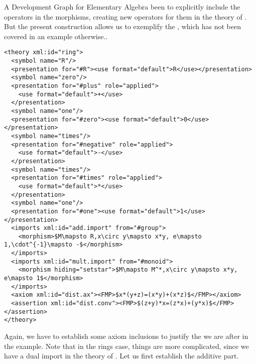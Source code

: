 \begin{omgroup}[id=dg-elal]{A Development Graph for Elementary Algebra}
{  been to explicitly include the operators in the morphisms, creating new operators for
  them in the theory of {}.  But the present construction allows us to
  exemplify the {}, which has not been covered in an example
  otherwise.}.
\begin{lstlisting}[mathescape,index={theory,imports}]
<theory xml:id="ring"> 
  <symbol name="R"/>
  <presentation for="#R"><use format="default">R</use></presentation>
  <symbol name="zero"/>
  <presentation for="#plus" role="applied">
    <use format="default">+</use>
  </presentation>
  <symbol name="one"/> 
  <presentation for="#zero"><use format="default">0</use></presentation>
  <symbol name="times"/>
  <presentation for="#negative" role="applied">
    <use format="default">-</use>
  </presentation>
  <symbol name="times"/>
  <presentation for="#times" role="applied">
    <use format="default">*</use>
  </presentation>
  <symbol name="one"/> 
  <presentation for="#one"><use format="default">1</use></presentation>
  <imports xml:id="add.import" from="#group"> 
    <morphism>$M\mapsto R,x\circ y\mapsto x*y, e\mapsto 1,\cdot^{-1}\mapsto -$</morphism> 
  </imports> 
  <imports xml:id="mult.import" from="#monoid"> 
    <morphism hiding="setstar">$M\mapsto M^*,x\circ y\mapsto x*y, e\mapsto 1$</morphism> 
  </imports> 
  <axiom xml:id="dist.ax"><FMP>$x*(y+z)=(x*y)+(x*z)$</FMP></axiom> 
  <assertion xml:id="dist.conv"><FMP>$(z+y)*x=(z*x)+(y*x)$</FMP></assertion>
</theory>
\end{lstlisting}
Again, we have to establish some axiom inclusions to justify the
{} we are after in the example. Note that in the
rings case, things are more complicated, since we have a dual import in the theory
of {}. Let us first establish the additive part. 
 

\end{omgroup}
